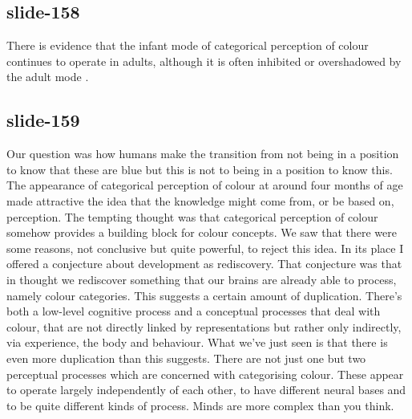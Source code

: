 \documentclass[12pt,\papersize]{extarticle}
\begin{document}
\subsection{slide-158}
There is evidence that the infant mode of categorical perception of colour continues to operate in adults, although it is often inhibited or overshadowed
by the adult mode \citep{Gilbert:2006yb}.

\subsection{slide-159}
Our question was how humans make the transition from not being in a position to know that these are blue but this is not to being in a position to know this.
The appearance of categorical perception of colour at around four months of age made attractive the idea that the knowledge might come from, or be based on,
perception.
The tempting thought was that categorical perception of colour somehow provides a building block for colour concepts.
We saw that there were some reasons, not conclusive but quite powerful, to reject this idea.
In its place I offered a conjecture about development as rediscovery.
That conjecture was that in thought we rediscover something that our brains are already able to process, namely colour categories.
This suggests a certain amount of duplication. There's both a low-level cognitive process and a conceptual processes that deal with colour, that are not
directly linked by representations but rather only indirectly, via experience, the body and behaviour.
What we've just seen is that there is even more duplication than this suggests.
There are not just one but two perceptual processes which are concerned with categorising colour.
These appear to operate largely independently of each other, to have different neural bases and to be quite different kinds of process.
Minds are more complex than you think.








\end{document}

